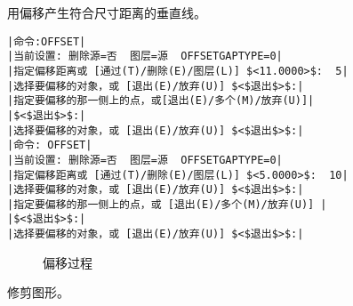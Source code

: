 \begin{procedure}
\item 用偏移产生符合尺寸距离的垂直线。
\begin{lstlisting}
|命令:OFFSET|
|当前设置: 删除源=否  图层=源  OFFSETGAPTYPE=0|
|指定偏移距离或 [通过(T)/删除(E)/图层(L)] $<11.0000>$:  5|
|选择要偏移的对象，或 [退出(E)/放弃(U)] $<$退出$>$:|
|指定要偏移的那一侧上的点，或[退出(E)/多个(M)/放弃(U)]|
|$<$退出$>$:|
|选择要偏移的对象，或 [退出(E)/放弃(U)] $<$退出$>$:|
|命令: OFFSET|
|当前设置: 删除源=否  图层=源  OFFSETGAPTYPE=0|
|指定偏移距离或 [通过(T)/删除(E)/图层(L)] $<5.0000>$:  10|
|选择要偏移的对象，或 [退出(E)/放弃(U)] $<$退出$>$:|
|指定要偏移的那一侧上的点，或 [退出(E)/多个(M)/放弃(U)] |
|$<$退出$>$:|
|选择要偏移的对象，或 [退出(E)/放弃(U)] $<$退出$>$:|
\end{lstlisting}
\begin{figure}[htbp]
\centering
{}\hspace{20pt}
\hspace{20pt}
\caption{偏移过程}
\end{figure}
\item 修剪图形。


\end{procedure}
